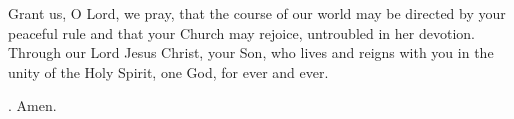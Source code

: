 \lettrine[lines=3]{G}{}rant us, O Lord, we pray,
that the course of our world
may be directed by your peaceful rule
and that your Church may rejoice,
untroubled in her devotion.
Through our Lord Jesus Christ, your Son,
who lives and reigns with you in the unity of the Holy Spirit,
one God, for ever and ever. \par \Rbar. Amen.
